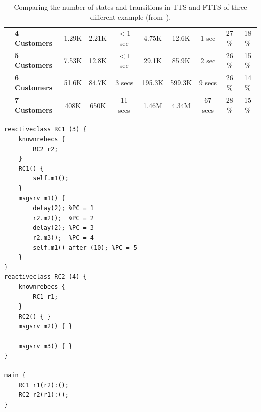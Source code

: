 \begin{table}
\begin{center}
\begin{tabular}{|l|l|c|c|c|c|c|c|c|c|}
        & \textbf{4 Customers} & 1.29K     & 2.21K     & $<1$ sec  & 4.75K     & 12.6K      & 1 sec     & 27$\%$  & 18$\%$   \\
        & \textbf{5 Customers} & 7.53K & 12.8K & $<1$ sec  & 29.1K & 85.9K & 2 sec  & 26$\%$  & 15$\%$   \\
        & \textbf{6 Customers} & 51.6K & 84.7K & 3 secs  & 195.3K & 599.3K  & 9 secs  & 26$\%$  & 14$\% $  \\
        & \textbf{7 Customers} & 408K  & 650K  & 11 secs  & 1.46M  & 4.34M & 67 secs  & 28$\%$  & 15$\% $  \\
        \hline
        \end{tabular}
        \end{center}
        \caption{Comparing the number of states and transitions in TTS and FTTS of three different example (from~\cite{ehsan-phd-thesis}). %
        }
\label{table::TTS-FTTS-experiment}
\end{table}

\begin{lstlisting}[language=rebeca, caption= A simple Timed Rebeca model with two rebecs, label=src::FTTS-actor-model]
reactiveclass RC1 (3) {
	knownrebecs {
		RC2 r2;
	}
	RC1() {
		self.m1();
	}
	msgsrv m1() {
		delay(2); %PC = 1
		r2.m2();  %PC = 2 
		delay(2); %PC = 3 
		r2.m3();  %PC = 4
		self.m1() after (10); %PC = 5
	}
}
reactiveclass RC2 (4) {
	knownrebecs {
		RC1 r1;
	}
	RC2() { }
	msgsrv m2() { }
	
	msgsrv m3() { }
}

main {
	RC1 r1(r2):();
	RC2 r2(r1):();
}

\end{lstlisting}

